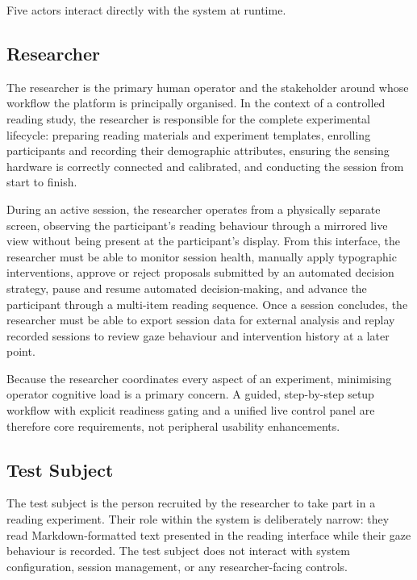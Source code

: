 Five actors interact directly with the system at runtime.

\subsection{Researcher}
\label{sec:stakeholder-researcher}

The researcher is the primary human operator and the stakeholder around whose workflow the platform is principally organised.
In the context of a controlled reading study, the researcher is responsible for the complete experimental lifecycle: preparing reading materials and experiment templates, enrolling participants and recording their demographic attributes, ensuring the sensing hardware is correctly connected and calibrated, and conducting the session from start to finish.

During an active session, the researcher operates from a physically separate screen, observing the participant's reading behaviour through a mirrored live view without being present at the participant's display.
From this interface, the researcher must be able to monitor session health, manually apply typographic interventions, approve or reject proposals submitted by an automated decision strategy, pause and resume automated decision-making, and advance the participant through a multi-item reading sequence.
Once a session concludes, the researcher must be able to export session data for external analysis and replay recorded sessions to review gaze behaviour and intervention history at a later point.

Because the researcher coordinates every aspect of an experiment, minimising operator cognitive load is a primary concern.
A guided, step-by-step setup workflow with explicit readiness gating and a unified live control panel are therefore core requirements, not peripheral usability enhancements.

\subsection{Test Subject}
\label{sec:stakeholder-participant}

The test subject is the person recruited by the researcher to take part in a reading experiment.
Their role within the system is deliberately narrow: they read Markdown-formatted text presented in the reading interface while their gaze behaviour is recorded.
The test subject does not interact with system configuration, session management, or any researcher-facing controls.

